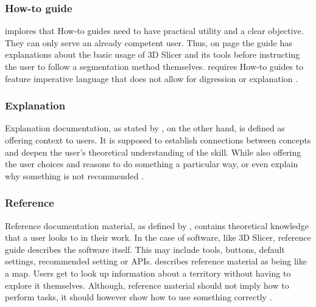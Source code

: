 \subsubsection*{How-to guide}
\citeauthor{procidaDiataxisDocumentationFramework2023} implores that How-to guides need to have practical utility and a clear objective.
They can only serve an already competent user.
Thus, on page \pageref{a:guide} the guide has explanations about the basic usage of 3D Slicer and its tools before instructing the user to follow a segmentation method themselves.
\citeauthor{procidaDiataxisDocumentationFramework2023} requires How-to guides to feature imperative language that does not allow for digression or explanation \cite{procidaPythonDocsCommunity2022,procidaDiataxisDocumentationFramework2023}.

\subsubsection*{Explanation}
Explanation documentation, as stated by \citeauthor{procidaDiataxisDocumentationFramework2023}, on the other hand, is defined as offering context to users.
It is supposed to establish connections between concepts and deepen the user's theoretical understanding of the skill.
While also offering the user choices and reasons to do something a particular way, or even explain why something is not recommended \cite{procidaPythonDocsCommunity2022,procidaDiataxisDocumentationFramework2023}.

\subsubsection*{Reference}
Reference documentation material, as defined by \citeauthor{procidaDiataxisDocumentationFramework2023}, contains theoretical knowledge that a user looks to in their work.
In the case of software, like 3D Slicer, reference guide describes the software itself.
This may include tools, buttons, default settings, recommended setting or APIs.
\citeauthor{procidaDiataxisDocumentationFramework2023} describes reference material as being like a map.
Users get to look up information about a territory without having to explore it themselves.
Although, reference material should not imply how to perform tasks, it should however show how to use something correctly \cite{procidaPythonDocsCommunity2022,procidaDiataxisDocumentationFramework2023}.


